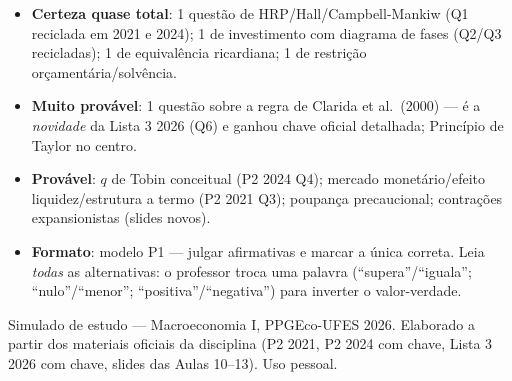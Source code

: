 \documentclass[12pt, a4paper]{article}
\begin{document}
\begin{provabox}[title={Prognóstico para a P2 2026 (baseado no padrão 2021 $\to$ 2024 $\to$ lista 2026)}]
\begin{itemize}[leftmargin=1.5em, itemsep=0.15em]
\item \textbf{Certeza quase total}: 1 questão de HRP/Hall/Campbell-Mankiw
(Q1 reciclada em 2021 e 2024); 1 de investimento com diagrama de fases
(Q2/Q3 recicladas); 1 de equivalência ricardiana; 1 de restrição
orçamentária/solvência.
\item \textbf{Muito provável}: 1 questão sobre a regra de Clarida et al.\
(2000) --- é a \emph{novidade} da Lista 3 2026 (Q6) e ganhou chave oficial
detalhada; Princípio de Taylor no centro.
\item \textbf{Provável}: $q$ de Tobin conceitual (P2 2024 Q4); mercado
monetário/efeito liquidez/estrutura a termo (P2 2021 Q3); poupança
precaucional; contrações expansionistas (slides novos).
\item \textbf{Formato}: modelo P1 --- julgar afirmativas e marcar a única
correta. Leia \emph{todas} as alternativas: o professor troca uma palavra
(``supera''/``iguala''; ``nulo''/``menor''; ``positiva''/``negativa'') para
inverter o valor-verdade.
\end{itemize}
\end{provabox}

\vfill
{\small\color{grayrbc} Simulado de estudo --- Macroeconomia I, PPGEco-UFES 2026.
Elaborado a partir dos materiais oficiais da disciplina (P2 2021, P2 2024 com
chave, Lista 3 2026 com chave, slides das Aulas 10--13). Uso pessoal.}
\end{document}
